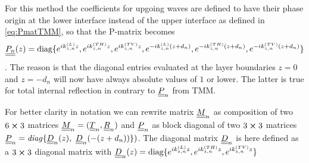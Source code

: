 For this method the coefficients for upgoing waves are defined to have their
phase origin at the lower interface instead of the upper interface as defined
in \ref{eq:PmatTMM}, so that the P-matrix becomes
\begin{equation}
    \underline{\underline{P_n}}(z) = \text{diag}\{ e^{ik_{z,n}^{(L)}z},
    e^{ik_{z,n}^{(TH)}z},
    e^{ik_{z,n}^{(TV)}z}, e^{-ik_{z,n}^{(L)}(z+d_n)},
    e^{-ik_{z,n}^{(TH)}(z+d_n)},
    e^{-ik_{z,n}^{(TV)}(z+d_n)}\}
\end{equation}.
The reason is that the diagonal entries evaluated at the layer boundaries $z=0$
and $z=-d_n$ will now have always absolute values of $1$ or lower. The latter
is true for total internal reflection in contrary to $\underline{\underline{P}}_n$ from TMM.

For better clarity in notation we can rewrite matrix $\underline{\underline{M}}_n$ as
composition of two $6\cross 3$ matrices $\underline{\underline{M}}_n = (\underline{\underline{T}}_n,
    \underline{\underline{R}}_n)$ and $\underline{\underline{P}}_n$ as block diagonal of two $3\cross 3$
matrices $\underline{\underline{P}}_n = \mathit{diag}\{\underline{\underline{D}}_n(z),\
    \underline{\underline{D}}_n(-(z+d_n))
    \})$. The diagonal matrix $\underline{\underline{D}}_n$ is here defined as a $3\cross3$
diagonal matrix with $\underline{\underline{D}}_n(z) = \text{diag}\{ e^{ik_{z,n}^{(L)}z},
    e^{ik_{z,n}^{(TH)}z}, e^{ik_{z,n}^{(TV)}z}\}$

